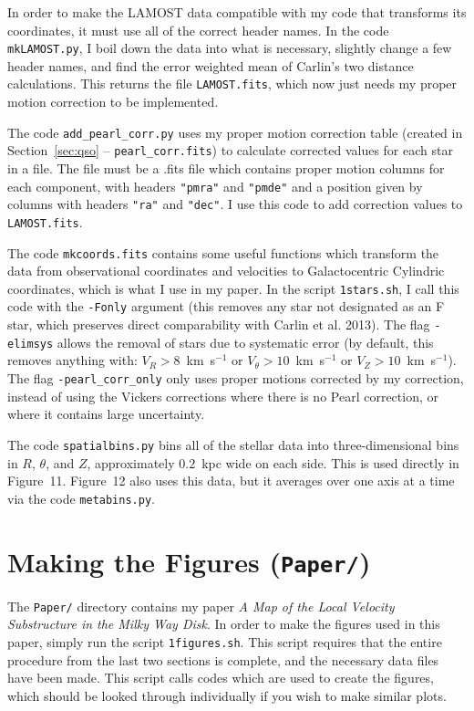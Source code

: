 \documentclass{article}
\begin{document}
In order to make the LAMOST data compatible with my code that transforms its coordinates, it must use all of the correct header names. In the code \texttt{mkLAMOST.py}, I boil down the data into what is necessary, slightly change a few header names, and find the error weighted mean of Carlin's two distance calculations. This returns the file \texttt{LAMOST.fits}, which now just needs my proper motion correction to be implemented.

The code \texttt{add\_pearl\_corr.py} uses my proper motion correction table (created in Section~\ref{sec:qso} -- \texttt{pearl\_corr.fits}) to calculate corrected values for each star in a file. The file must be a .fits file which contains proper motion columns for each component, with headers \texttt{"pmra"} and \texttt{"pmde"} and a position given by columns with headers \texttt{"ra"} and \texttt{"dec"}. I use this code to add correction values to \texttt{LAMOST.fits}.

The code \texttt{mkcoords.fits} contains some useful functions which transform the data from observational coordinates and velocities to Galactocentric Cylindric coordinates, which is what I use in my paper. In the script \texttt{1stars.sh}, I call this code with the \texttt{-Fonly} argument (this removes any star not designated as an F star, which preserves direct comparability with Carlin et al. 2013). The flag \texttt{-elimsys} allows the removal of stars due to systematic error (by default, this removes anything with: $V_R > 8$~km~s$^{-1}$ or $V_\theta > 10$~km~s$^{-1}$ or $V_Z > 10$~km~s$^{-1}$). The flag \texttt{-pearl\_corr\_only} only uses proper motions corrected by my correction, instead of using the Vickers corrections where there is no Pearl correction, or where it contains large uncertainty.

The code \texttt{spatialbins.py} bins all of the stellar data into three-dimensional bins in $R$, $\theta$, and $Z$, approximately $0.2$~kpc wide on each side. This is used directly in Figure~11. Figure~12 also uses this data, but it averages over one axis at a time via the code \texttt{metabins.py}.

\section{Making the Figures (\texttt{Paper/})}

The \texttt{Paper/} directory contains my paper \textit{A Map of the Local Velocity Substructure in the Milky Way Disk}. In order to make the figures used in this paper, simply run the script \texttt{1figures.sh}. This script requires that the entire procedure from the last two sections is complete, and the necessary data files have been made. This script calls codes which are used to create the figures, which should be looked through individually if you wish to make similar plots.
\end{document}
